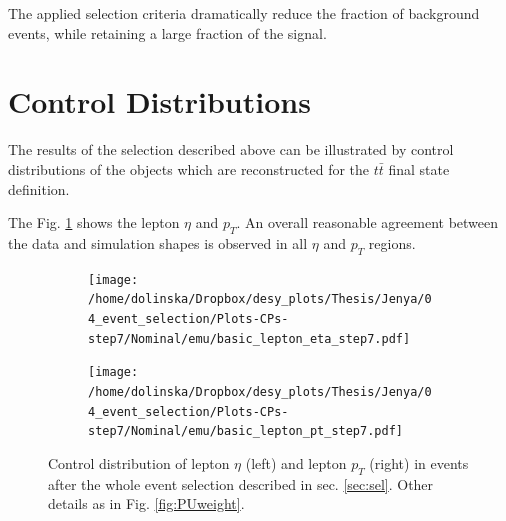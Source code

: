 The applied selection criteria dramatically reduce the fraction of background events, while retaining a large fraction of the signal.

\section{Control Distributions}

The results of the selection described above can be illustrated by control distributions of the objects which are reconstructed for the $t\bar{t}$
final state definition.

The Fig. \ref{fig:CPetaptLep} shows the lepton $\eta$ and $p_{T}$. An overall reasonable agreement between the data and simulation shapes is observed in all $\eta$ and $p_{T}$
regions. 

 \begin{figure}[h]
 \centering
 \begin{subfigure}
   \centering
   \texttt{[image: /home/dolinska/Dropbox/desy\_plots/Thesis/Jenya/04\_event\_selection/Plots-CPs-step7/Nominal/emu/basic\_lepton\_eta\_step7.pdf]}
 \end{subfigure}
 \begin{subfigure}
   \centering
   \texttt{[image: /home/dolinska/Dropbox/desy\_plots/Thesis/Jenya/04\_event\_selection/Plots-CPs-step7/Nominal/emu/basic\_lepton\_pt\_step7.pdf]}
 \end{subfigure}
 \caption{Control distribution of lepton $\eta$ (left) and lepton $p_{T}$ (right) in events after the whole event selection described in sec. \ref{sec:sel}. 
 Other details as in Fig. \ref{fig:PUweight}.}
 \label{fig:CPetaptLep}
 \end{figure}
%  
 
